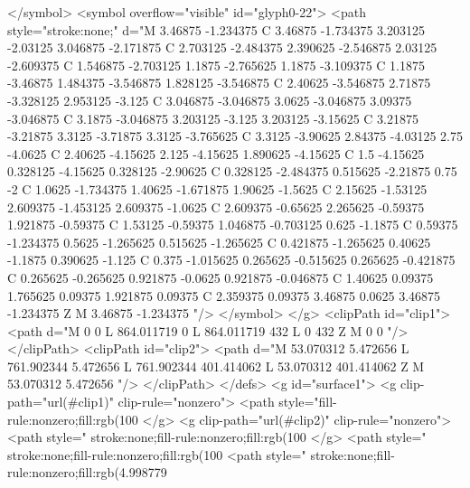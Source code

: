 </symbol>
<symbol overflow="visible" id="glyph0-22">
<path style="stroke:none;" d="M 3.46875 -1.234375 C 3.46875 -1.734375 3.203125 -2.03125 3.046875 -2.171875 C 2.703125 -2.484375 2.390625 -2.546875 2.03125 -2.609375 C 1.546875 -2.703125 1.1875 -2.765625 1.1875 -3.109375 C 1.1875 -3.46875 1.484375 -3.546875 1.828125 -3.546875 C 2.40625 -3.546875 2.71875 -3.328125 2.953125 -3.125 C 3.046875 -3.046875 3.0625 -3.046875 3.09375 -3.046875 C 3.1875 -3.046875 3.203125 -3.125 3.203125 -3.15625 C 3.21875 -3.21875 3.3125 -3.71875 3.3125 -3.765625 C 3.3125 -3.90625 2.84375 -4.03125 2.75 -4.0625 C 2.40625 -4.15625 2.125 -4.15625 1.890625 -4.15625 C 1.5 -4.15625 0.328125 -4.15625 0.328125 -2.90625 C 0.328125 -2.484375 0.515625 -2.21875 0.75 -2 C 1.0625 -1.734375 1.40625 -1.671875 1.90625 -1.5625 C 2.15625 -1.53125 2.609375 -1.453125 2.609375 -1.0625 C 2.609375 -0.65625 2.265625 -0.59375 1.921875 -0.59375 C 1.53125 -0.59375 1.046875 -0.703125 0.625 -1.1875 C 0.59375 -1.234375 0.5625 -1.265625 0.515625 -1.265625 C 0.421875 -1.265625 0.40625 -1.1875 0.390625 -1.125 C 0.375 -1.015625 0.265625 -0.515625 0.265625 -0.421875 C 0.265625 -0.265625 0.921875 -0.0625 0.921875 -0.046875 C 1.40625 0.09375 1.765625 0.09375 1.921875 0.09375 C 2.359375 0.09375 3.46875 0.0625 3.46875 -1.234375 Z M 3.46875 -1.234375 "/>
</symbol>
</g>
<clipPath id="clip1">
  <path d="M 0 0 L 864.011719 0 L 864.011719 432 L 0 432 Z M 0 0 "/>
</clipPath>
<clipPath id="clip2">
  <path d="M 53.070312 5.472656 L 761.902344 5.472656 L 761.902344 401.414062 L 53.070312 401.414062 Z M 53.070312 5.472656 "/>
</clipPath>
</defs>
<g id="surface1">
<g clip-path="url(#clip1)" clip-rule="nonzero">
<path style="fill-rule:nonzero;fill:rgb(100%
</g>
<g clip-path="url(#clip2)" clip-rule="nonzero">
<path style=" stroke:none;fill-rule:nonzero;fill:rgb(100%
</g>
<path style=" stroke:none;fill-rule:nonzero;fill:rgb(100%
<path style=" stroke:none;fill-rule:nonzero;fill:rgb(4.998779%
